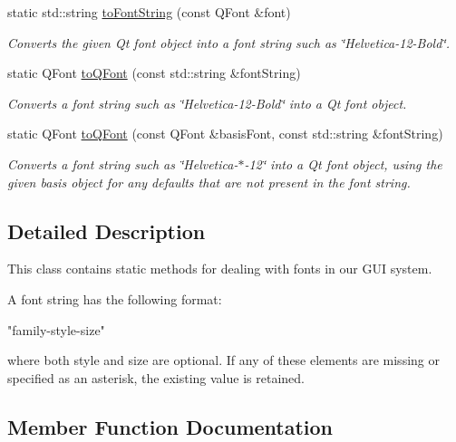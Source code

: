 \begin{DoxyCompactItemize}
static std\+::string \mbox{\hyperlink{classsgl_1_1GFont_a1e897239fcf0fa78a33f3021a98b0029}{to\+Font\+String}} (const Q\+Font \&font)
\begin{DoxyCompactList}\small\item\em Converts the given Qt font object into a font string such as \char`\"{}\+Helvetica-\/12-\/\+Bold\char`\"{}. \end{DoxyCompactList}\item 
static Q\+Font \mbox{\hyperlink{classsgl_1_1GFont_aea0f70979b631219291103391bfacc6e}{to\+Q\+Font}} (const std\+::string \&font\+String)
\begin{DoxyCompactList}\small\item\em Converts a font string such as \char`\"{}\+Helvetica-\/12-\/\+Bold\char`\"{} into a Qt font object. \end{DoxyCompactList}\item 
static Q\+Font \mbox{\hyperlink{classsgl_1_1GFont_a7eea6ca714d168dc53c86124bb4fc387}{to\+Q\+Font}} (const Q\+Font \&basis\+Font, const std\+::string \&font\+String)
\begin{DoxyCompactList}\small\item\em Converts a font string such as \char`\"{}\+Helvetica-\/$\ast$-\/12\char`\"{} into a Qt font object, using the given \textquotesingle{}basis\textquotesingle{} object for any defaults that are not present in the font string. \end{DoxyCompactList}\end{DoxyCompactItemize}


\subsection{Detailed Description}
This class contains static methods for dealing with fonts in our G\+UI system. 

A font string has the following format\+:


\begin{DoxyPre}
"family-style-size"
\end{DoxyPre}


where both {\ttfamily style} and {\ttfamily size} are optional. If any of these elements are missing or specified as an asterisk, the existing value is retained. 

\subsection{Member Function Documentation}
\mbox{\label{classsgl_1_1GFont_ae709c4560c613217490269d4df94602c}} 
